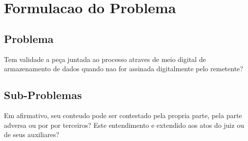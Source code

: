 \chapter{Formulacao do Problema}

\section{Problema}
Tem validade a peça juntada ao processo atraves de meio digital de armazenamento de dados quando nao for assinada digitalmente pelo remetente?

\section{Sub-Problemas}
Em afirmativo\cite{Electroceramics}, seu conteudo pode ser contestado pela propria parte, pela parte adversa ou por por terceiros? Este entendimento e extendido aos atos do juiz ou de seus auxiliares?
